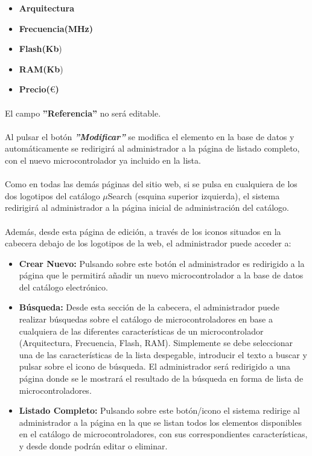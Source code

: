 
\begin{itemize}
\item \textbf{Arquitectura}
\item \textbf{Frecuencia(MHz)}
\item \textbf{Flash(Kb})
\item \textbf{RAM(Kb}) 
\item \textbf{Precio($\euro$)}
\end{itemize}

\paragraph{} El campo \textbf{''Referencia''} no será editable.

\paragraph{} Al pulsar el botón \textbf{\textit{''Modificar''}} se modifica el elemento en la base de datos y automáticamente se redirigirá al administrador a la página de listado completo, con el nuevo microcontrolador ya incluido en la lista.

\paragraph{}Como en todas las demás páginas del sitio web, si se pulsa en cualquiera de los dos logotipos del catálogo $\mu$Search (esquina superior izquierda), el sistema redirigirá al administrador a la página inicial de administración del catálogo.

\paragraph{}Además, desde esta página de edición, a través de los iconos situados en la cabecera debajo de los logotipos de la web, el administrador puede acceder a:

\begin{itemize}
	\item \textbf{Crear Nuevo:} Pulsando sobre este botón el administrador es redirigido a la página que le permitirá añadir un nuevo microcontrolador a la base de datos del catálogo electrónico.

	\item \textbf{Búsqueda:} Desde esta sección de la cabecera, el administrador puede realizar búsquedas sobre el catálogo de microcontroladores en base a cualquiera de las diferentes características de un microcontrolador (Arquitectura, Frecuencia, Flash, RAM). Simplemente se debe seleccionar una de las características de la lista despegable, introducir el texto a buscar y pulsar sobre el icono de búsqueda.
	El administrador será redirigido a una página donde se le mostrará el resultado de la búsqueda en forma de lista de microcontroladores.
			
	\item \textbf{Listado Completo:} Pulsando sobre este botón/icono el sistema redirige al administrador a la página en la que se listan todos los elementos disponibles en el catálogo de microcontroladores, con sus correspondientes características, y desde donde podrán editar o eliminar.
\end{itemize}